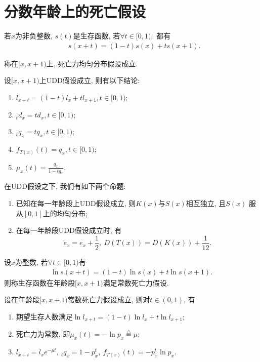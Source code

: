 \documentclass[lang=cn,10pt]{elegantbook}
\begin{document}
\section{分数年龄上的死亡假设}
\begin{definition}
	若$x$为非负整数, $s(t)$是生存函数, 若$\forall t\in [0,1),$ 都有
\begin{align}\label{tula}
     & s(x+t)=(1-t)s(x)+ts(x+1).
\end{align}

称在$[x,x+1)$上, 死亡力均匀分布假设成立.
\end{definition}

\begin{corollary}
	设$[x,x+1)$上UDD假设成立, 则有以下结论:
	\begin{enumerate}
		\item $l_{x+t}=(1-t)l_{x}+tl_{x+1},t\in [0,1);$
		\item $_{t}d_{x}=td_{x},t\in [0,1);$
		\item $_{t}q_{x}=tq_{x},t\in [0,1);$
		\item $f_{T(x)}(t)=q_{x},t\in [0,1);$
		\item $\mu_{x}(t)=\frac{q_{x}}{1-tq_x}.$
	\end{enumerate}
\end{corollary}

\begin{proposition}
	在UDD假设之下, 我们有如下两个命题:
	\begin{enumerate}
		\item 已知在每一年龄段上UDD假设成立, 则$K(x)$与$S(x)$相互独立, 且$S(x)$ 服从$[0,1]$上的均匀分布;
		\item 在每一年龄段UDD假设成立时, 有
    $$\mathring{e}_{x}=e_{x}+\frac{1}{2},\   D(T(x))=D(K(x))+\frac{1}{12}.$$
	\end{enumerate}
\end{proposition}

\begin{definition}[常数死亡力假设]
	设$x$为整数, 若$\forall t\in [0,1)$有
\begin{align}\label{tulb}
    \ln s(x+t)=(1-t)\ln s(x)+t\ln s(x+1).
\end{align}
则称生存函数在年龄段$[x,x+1)$满足常数死亡力假设.
\end{definition}

\begin{corollary}
	设在年龄段$[x,x+1)$常数死亡力假设成立, 则对$t\in (0,1)$, 有
    \begin{enumerate}
		\item 期望生存人数满足$\ln l_{x+t}=(1-t)\ln l_{x}+t\ln l_{x+1};$
		\item 死亡力为常数, 即$\mu _{x}(t)=-\ln p_{x}\stackrel{\triangle}{=}\mu;$
		\item $l_{x+t}=l_{x}e^{-\mu t},\ _{t}q_{x}=1-p^{t}_{x},\ f_{T(x)}(t)=-p_{x}^{t}\ln p_{x}.$
	\end{enumerate}
\end{corollary}
\end{document}
